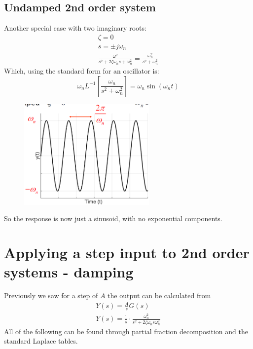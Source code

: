 \documentclass[class=report, crop=false, 12pt,a4paper]{standalone}
\begin{document}
\subsection{Undamped 2nd order system}
Another special case with two imaginary roots:
\begin{gather}
  \zeta = 0\\
  s = \pm j \omega_n\\
  \frac{\omega^2}{s^2 + 2\zeta\omega_n s+ \omega_n^2} = \frac{\omega_n^2}{s^2 + \omega_n^2}
\end{gather}
Which, using the standard form for an oscillator is:
\begin{equation}
  \omega_n L^{-1} \left[ \frac{\omega_n}{s^2 + \omega_n^2} \right] = \omega_n \sin{(\omega_n t)}
\end{equation}
\begin{figure}[H]
  \centering
  \includegraphics[width = 0.6\textwidth]{../img/diagram71.png}
\end{figure}
So the response is now just a sinusoid, with no exponential components.
\section{Applying a step input to 2nd order systems - damping}
Previously we saw for a step of $A$ the output can be calculated from
\begin{gather}
  Y(s) = \frac{A}{s} G(s)\\
  Y(s) = \frac{1}{s} \cdot \frac{\omega_n^2}{s^2 + 2\zeta \omega_n s \omega_n^2}
\end{gather}
All of the following can be found through partial fraction decomposition and the standard Laplace tables.
\end{document}
